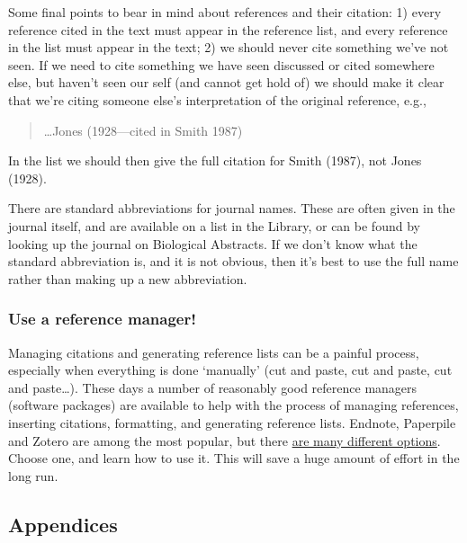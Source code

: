 \documentclass[
]{book}
\newenvironment{greybox}{
  \definecolor{shadecolor}{rgb}{0.95,0.95,0.95}  %
  \color{black}
  \begin{shaded}}
 {\end{shaded}}
\newenvironment{infobox}[1]
  {
  \begin{itemize}
  \renewcommand{\labelitemi}{
    \raisebox{-.7\height}[0pt][0pt]{
      {\setkeys{Gin}{width=3em,keepaspectratio}
        \texttt{[image: images/\#1]}}
    }
  }
  \setlength{\fboxsep}{1em}
  \begin{greybox}
  \item
  }
  {
  \end{greybox}
  \end{itemize}
  }
\begin{document}
Some final points to bear in mind about references and their citation: 1) every reference cited in the text must appear in the reference list, and every reference in the list must appear in the text; 2) we should never cite something we've not seen. If we need to cite something we have seen discussed or cited somewhere else, but haven't seen our self (and cannot get hold of) we should make it clear that we're citing someone else's interpretation of the original reference, e.g.,

\begin{quote}
\ldots Jones (1928---cited in Smith 1987)
\end{quote}

In the list we should then give the full citation for Smith (1987), not Jones (1928).

There are standard abbreviations for journal names. These are often given in the journal itself, and are available on a list in the Library, or can be found by looking up the journal on Biological Abstracts. If we don't know what the standard abbreviation is, and it is not obvious, then it's best to use the full name rather than making up a new abbreviation.

\begin{infobox}{information}

\hypertarget{use-a-reference-manager}{%
\subsubsection*{Use a reference manager!}\label{use-a-reference-manager}}

Managing citations and generating reference lists can be a painful process, especially when everything is done `manually' (cut and paste, cut and paste, cut and paste\ldots). These days a number of reasonably good reference managers (software packages) are available to help with the process of managing references, inserting citations, formatting, and generating reference lists. Endnote, Paperpile and Zotero are among the most popular, but there \href{https://en.wikipedia.org/wiki/Comparison_of_reference_management_software}{are many different options}. Choose one, and learn how to use it. This will save a huge amount of effort in the long run.

\end{infobox}

\hypertarget{appendices}{%
\subsection{Appendices}\label{appendices}}
\end{document}
